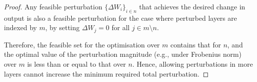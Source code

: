\documentclass[10pt,a4paper]{amsart}
\begin{document}
\begin{proof}
 Any feasible perturbation $\{\Delta W_i\}_{i \in n}$ that achieves the desired change in output is also a feasible perturbation for the case where perturbed layers are indexed by $m$, by setting $\Delta W_j = 0$ for all $j \in m \setminus n$.

Therefore, the feasible set for the optimisation over $m$ contains that for $n$, and the optimal value of the perturbation magnitude (e.g., under Frobenius norm) over $m$ is less than or equal to that over $n$. Hence, allowing perturbations in more layers cannot increase the minimum required total perturbation.
\end{proof}
\end{document}
